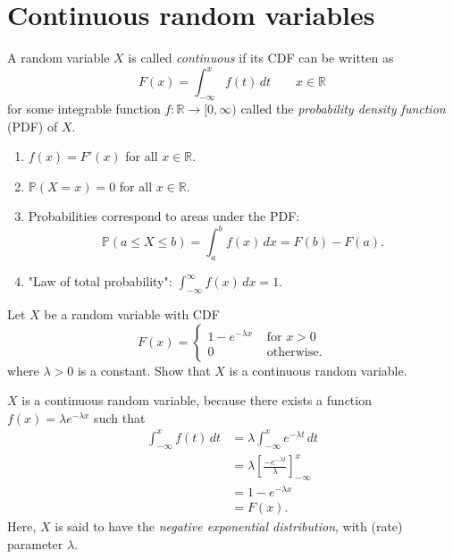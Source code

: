 \documentclass[lecture]{csm}
\newcommand{\prob}{\mathbb{P}}
\newcommand{\R}{\mathbb{R}}
\def\it{\item}
\def\ben{\begin{enumerate}}
\def\een{\end{enumerate}}
\begin{document}
\maketitle
\tableofcontents


\section{Continuous random variables}

\begin{definition}
A random variable $X$ is called \emph{continuous} if its CDF can be written as 
\[
F(x) = \int_{-\infty}^x f(t)\,dt\qquad x\in\R
\]
for some integrable function $f:\R\to[0,\infty)$ called the \emph{probability density function} (PDF) of $X$.
\end{definition}

\begin{remark}
\ben
\it $f(x) = F'(x)$ for all $x\in\R$.
\it $\prob(X=x)=0$ for all $x\in\R$.
\it Probabilities correspond to areas under the PDF: 
\[
\prob(a\leq X\leq b) = \int_a^b f(x)\,dx = F(b) - F(a).
\]
\it "Law of total probability": $\displaystyle\int_{-\infty}^{\infty} f(x)\,dx = 1.$
\een
\end{remark}

\begin{example}\label{ex:cts_exp}
Let $X$ be a random variable with CDF
\[
F(x) = \left\{\begin{array}{ll}
	1-e^{-\lambda x} & \text{ for } x>0 \\
	0				& \text{ otherwise.}
\end{array}\right.
\]
where $\lambda>0$ is a constant. Show that $X$ is a continuous random variable.
\end{example}
\begin{solution}
$X$ is a continuous random variable, because there exists a function $f(x) = \lambda e^{-\lambda x}$ such that
\begin{align*}
\int_{-\infty}^x f(t)\,dt 
	& = \lambda \int_{-\infty}^x e^{-\lambda t}\,dt \\
	& = \lambda\left[\frac{-e^{-\lambda t}}{\lambda}\right]_{-\infty}^x \\
	& = 1 - e^{-\lambda x} \\
	& = F(x).
\end{align*}
Here, $X$ is said to have the \emph{negative exponential distribution}, with (rate) parameter $\lambda$.
\end{solution}
\end{document}
